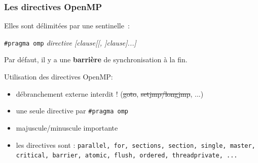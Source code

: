 \documentclass{beamer}
\begin{document}
\begin{frame}
  \frametitle{Les directives OpenMP}

Elles sont délimitées par une sentinelle~:

\begin{framed}
  {\tt \#pragma omp} {\it directive [clause[[, ]clause]...]}   
\end{framed}
 
Par défaut, il y a une \textbf{barrière} de synchronisation à la fin. 

\medskip

\begin{block}{Utilisation des directives OpenMP:}
\begin{itemize}
\item débranchement externe interdit ! (\sout{goto}, \sout{setjmp/longjmp}, ...)
\item une seule directive par {\tt \#pragma omp}
\item majuscule/minuscule importante

\item les directives sont : {\tt parallel, for, sections, section, single, master, critical,
  barrier, atomic, flush, ordered, threadprivate, ...}
\end{itemize}
\end{block}

\end{frame}
\end{document}
